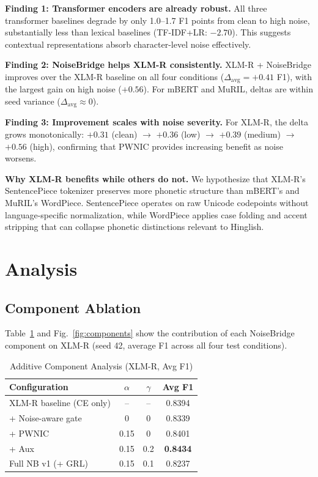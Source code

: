 \documentclass[conference]{IEEEtran}
\begin{document}
\textbf{Finding 1: Transformer encoders are already robust.} All three transformer baselines degrade by only 1.0--1.7 F1 points from clean to high noise, substantially less than lexical baselines (TF-IDF+LR: $-2.70$). This suggests contextual representations absorb character-level noise effectively.

\textbf{Finding 2: NoiseBridge helps XLM-R consistently.} XLM-R + NoiseBridge improves over the XLM-R baseline on all four conditions ($\Delta_\text{avg} = +0.41$ F1), with the largest gain on high noise ($+0.56$). For mBERT and MuRIL, deltas are within seed variance ($\Delta_\text{avg} \approx 0$).

\textbf{Finding 3: Improvement scales with noise severity.} For XLM-R, the delta grows monotonically: $+0.31$ (clean) $\to$ $+0.36$ (low) $\to$ $+0.39$ (medium) $\to$ $+0.56$ (high), confirming that PWNIC provides increasing benefit as noise worsens.

\textbf{Why XLM-R benefits while others do not.} We hypothesize that XLM-R's SentencePiece tokenizer preserves more phonetic structure than mBERT's and MuRIL's WordPiece. SentencePiece operates on raw Unicode codepoints without language-specific normalization, while WordPiece applies case folding and accent stripping that can collapse phonetic distinctions relevant to Hinglish.

\section{Analysis}
\label{sec:analysis}

\subsection{Component Ablation}

Table~\ref{tab:components} and Fig.~\ref{fig:components} show the contribution of each NoiseBridge component on XLM-R (seed 42, average F1 across all four test conditions).

\begin{table}[!t]
\caption{Additive Component Analysis (XLM-R, Avg F1)}
\label{tab:components}
\centering
\small
\begin{tabular}{lccc}
\toprule
\textbf{Configuration} & $\alpha$ & $\gamma$ & \textbf{Avg F1} \\
\midrule
XLM-R baseline (CE only) & -- & -- & 0.8394 \\
\quad + Noise-aware gate  & 0   & 0   & 0.8339 \\
\quad\quad + PWNIC         & 0.15& 0   & 0.8401 \\
\quad\quad\quad + Aux      & 0.15& 0.2 & \textbf{0.8434} \\
\midrule
Full NB v1 (+ GRL)        & 0.15& 0.1 & 0.8237 \\
\bottomrule
\end{tabular}
\end{table}
\end{document}

